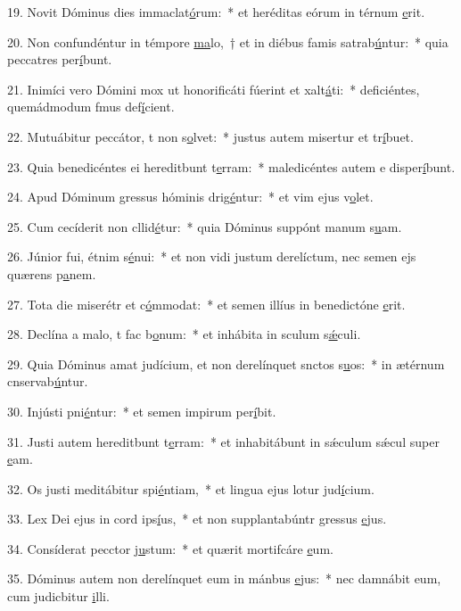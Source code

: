 19. Novit Dóminus dies immaclat\uline{ó}rum:~* et heréditas eórum in térnum \uline{e}rit.\par 
20. Non confundéntur in témpore \uline{ma}lo,~† et in diébus famis satrab\uline{ú}ntur:~* quia peccatres per\uline{í}bunt.\par 
21. Inimíci vero Dómini mox ut honorificáti fúerint et xalt\uline{á}ti:~* deficiéntes, quemádmodum fmus def\uline{í}cient.\par 
22. Mutuábitur peccátor, t non s\uline{o}lvet:~* justus autem misertur et tr\uline{í}buet.\par 
23. Quia benedicéntes ei hereditbunt t\uline{e}rram:~* maledicéntes autem e disper\uline{í}bunt.\par 
24. Apud Dóminum gressus hóminis drig\uline{é}ntur:~* et vim ejus v\uline{o}let.\par 
25. Cum cecíderit non cllid\uline{é}tur:~* quia Dóminus suppónt manum s\uline{u}am.\par 
26. Júnior fui, étnim s\uline{é}nui:~* et non vidi justum derelíctum, nec semen ejs quærens p\uline{a}nem.\par 
27. Tota die miserétr et c\uline{ó}mmodat:~* et semen illíus in benedictóne \uline{e}rit.\par 
28. Declína a malo, t fac b\uline{o}num:~* et inhábita in sculum s\uline{ǽ}culi.\par 
29. Quia Dóminus amat judícium, et non derelínquet snctos s\uline{u}os:~* in ætérnum cnservab\uline{ú}ntur.\par 
30. Injústi pni\uline{é}ntur:~* et semen impirum per\uline{í}bit.\par 
31. Justi autem hereditbunt t\uline{e}rram:~* et inhabitábunt in sǽculum sǽcul super \uline{e}am.\par 
32. Os justi meditábitur spi\uline{é}ntiam,~* et lingua ejus lotur jud\uline{í}cium.\par 
33. Lex Dei ejus in cord ips\uline{í}us,~* et non supplantabúntr gressus \uline{e}jus.\par 
34. Consíderat pecctor j\uline{u}stum:~* et quærit mortifcáre \uline{e}um.\par 
35. Dóminus autem non derelínquet eum in mánbus \uline{e}jus:~* nec damnábit eum, cum judicbitur \uline{i}lli.\par 
